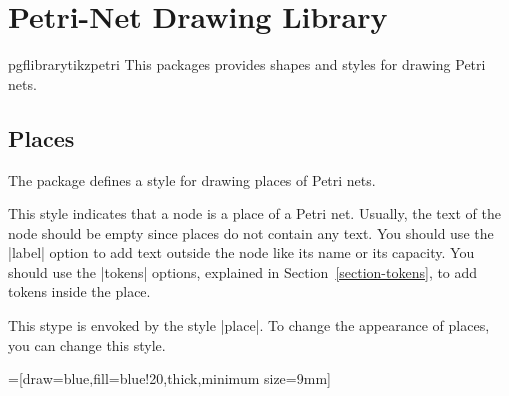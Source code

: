 %




\section{Petri-Net Drawing Library}

\begin{package}{pgflibrarytikzpetri}
  This packages provides shapes and styles for drawing Petri nets. 
\end{package}



\subsection{Places}

The package defines a style for drawing places of Petri nets. 

\begin{itemize}
  This style indicates that a node is a place of a Petri net. Usually,
  the text of the node should be empty since places do not contain any
  text. You should use the |label| option to add text outside the node
  like its name or its capacity. You should use the |tokens| options,
  explained in Section~\ref{section-tokens}, to add tokens inside the
  place.
  
\begin{codeexample}[]
\end{codeexample}
  
  This stype is envoked by the style |place|. To change the
  appearance of places, you can change this style.
\begin{codeexample}[]
=[draw=blue,fill=blue!20,thick,minimum size=9mm]
\end{codeexample}
\end{itemize}



